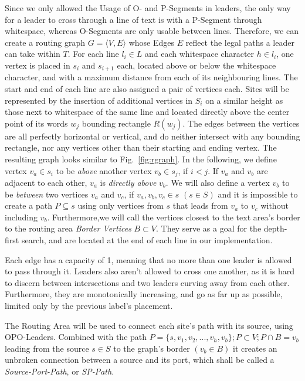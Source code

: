 \documentclass[11pt,a4paper]{vutinfth}
\begin{document}
Since we only allowed the Usage of O- and P-Segments in leaders, the only way for a leader to cross through a line of text is with a P-Segment through whitespace, whereas O-Segments are only usable between lines. Therefore, we can create a routing graph $G=\langle V,E\rangle$ whose Edges $E$ reflect the legal paths a leader can take within $T$.
For each line $l_i \in L$ and each whitespace character $h \in l_i$, one vertex is placed in $s_i$ and $s_{i+1}$ each, located above or below the whitespace character, and with a maximum distance from each of its neighbouring lines. The start and end of each line are also assigned a pair of vertices each. Sites will be represented by the insertion of additional vertices in $S_i$ on a similar height as those next to whitespace of the same line and located directly above the center point of its words $w_j$ bounding rectangle $R(w_j)$. The edges between the vertices are all perfectly horizontal or vertical, and do neither intersect with any bounding rectangle, nor any vertices other than their starting and ending vertex. The resulting graph looks similar to Fig.~\ref{fig:rgraph}.
In the following, we define vertex $v_a \in s_i$ to be \emph{above} another vertex $v_b \in s_j$, if $i<j$. If $v_a$ and $v_b$ are adjacent to each other, $v_a$ is \emph{directly above} $v_b$. We will also define a vertex $v_b$ to be \emph{between} two vertices $v_a$ and $v_c$, if $v_a, v_b, v_c \in s$ $(s \in S)$ and it is impossible to create a path $P \subseteq s$ using only vertices from $s$ that leads from $v_a$ to $v_c$ without including $v_b$.
Furthermore,we will call the vertices closest to the text area's border to the routing area \emph{Border Vertices} $B \subset V$. They serve as a goal for the depth-first search, and are located at the end of each line in our implementation.

Each edge has a capacity of 1, meaning that no more than one leader is allowed to pass through it. Leaders also aren't allowed to cross one another, as it is hard to discern between intersections and two leaders curving away from each other. Furthermore, they are monotonically increasing, and go as far up as possible, limited only by the previous label's placement.

The Routing Area will be used to connect each site's path with its source, using OPO-Leaders. Combined with the path $P=\{s, v_1, v_2, ..., v_h, v_b\}; P \subset V; P \cap B = v_b$ leading from the source $s \in S$ to the graph's border $(v_b \in B)$ it creates an unbroken connection between a source and its port, which shall be called a \emph{Source-Port-Path}, or \emph{SP-Path}.
\end{document}
